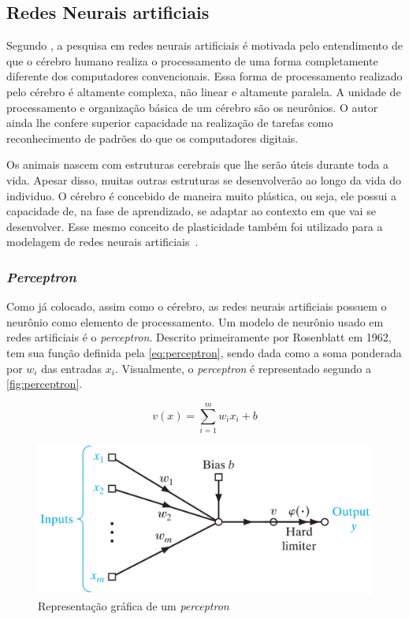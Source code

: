 \documentclass[
    12pt,
    oneside,
    a4paper,
    english,
    brazil
]{abntex2}
\begin{document}
\subsection{Redes Neurais artificiais}

Segundo  , a  pesquisa  em redes  neurais artificiais  é
motivada pelo entendimento  de que o cérebro humano realiza  o processamento de
uma forma completamente diferente dos computadores convencionais. Essa forma de
processamento  realizado  pelo  cérebro  é altamente  complexa,  não  linear  e
altamente  paralela. A  unidade de  processamento  e organização  básica de  um
cérebro são  os neurônios.  O autor  ainda lhe  confere superior  capacidade na
realização de  tarefas como  reconhecimento de padrões  do que  os computadores
digitais.

Os animais nascem  com estruturas cerebrais que lhe serão  úteis durante toda a
vida. Apesar disso, muitas outras estruturas  se desenvolverão ao longo da vida
do individuo.  O cérebro é  concebido de maneira  muito plástica, ou  seja, ele
possui a capacidade de,  na fase de aprendizado, se adaptar  ao contexto em que
vai se  desenvolver. Esse mesmo  conceito de plasticidade também  foi utilizado
para a modelagem de redes neurais artificiais~\cite{haykin2009}.

\subsubsection{\textit{Perceptron}}

Como já colocado, assim como o  cérebro, as redes neurais artificiais possuem o
neurônio como elemento  de processamento. Um modelo de neurônio  usado em redes
artificiais é  o \textit{perceptron}. Descrito primeiramente  por Rosenblatt em
1962, tem sua  função definida pela \autoref{eq:perceptron}, sendo  dada como a
soma ponderada por $w_i$ das entradas $x_i$. Visualmente, o \textit{perceptron}
é representado segundo a \autoref{fig:perceptron}.

\begin{equation}\label{eq:perceptron}
    v(x) = \sum_{i=1}^{m}{w_i  x_i + b}
\end{equation}

\begin{figure}[ht]
    \centering
    \caption{Representação gráfica de um \textit{perceptron}}\label{fig:perceptron}
    \includegraphics[width=.5\linewidth]{images/perceptron.png}
\end{figure}
\end{document}
